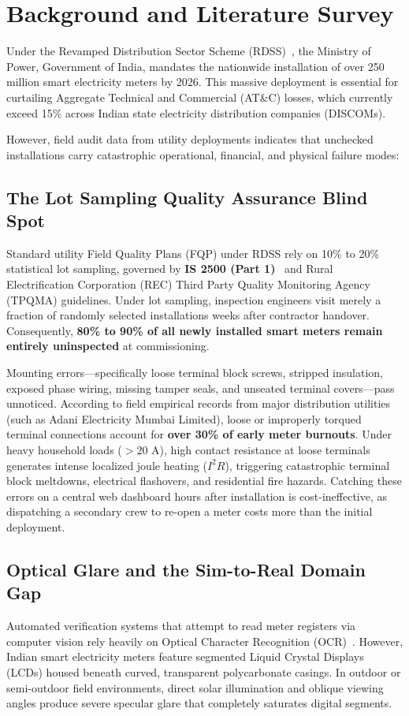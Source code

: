 \documentclass[12pt,a4paper,oneside]{report}
\begin{document}
\section{Background and Literature Survey}
Under the Revamped Distribution Sector Scheme (RDSS)~\cite{cea2021rdss}, the Ministry of Power, Government of India, mandates the nationwide installation of over 250 million smart electricity meters by 2026. This massive deployment is essential for curtailing Aggregate Technical and Commercial (AT\&C) losses, which currently exceed 15\% across Indian state electricity distribution companies (DISCOMs).

However, field audit data from utility deployments indicates that unchecked installations carry catastrophic operational, financial, and physical failure modes:

\subsection{The Lot Sampling Quality Assurance Blind Spot}
Standard utility Field Quality Plans (FQP) under RDSS rely on 10\% to 20\% statistical lot sampling, governed by \textbf{IS 2500 (Part 1)}~\cite{bis2500} and Rural Electrification Corporation (REC) Third Party Quality Monitoring Agency (TPQMA) guidelines. Under lot sampling, inspection engineers visit merely a fraction of randomly selected installations weeks after contractor handover. Consequently, \textbf{80\% to 90\% of all newly installed smart meters remain entirely uninspected} at commissioning.

Mounting errors---specifically loose terminal block screws, stripped insulation, exposed phase wiring, missing tamper seals, and unseated terminal covers---pass unnoticed. According to field empirical records from major distribution utilities (such as Adani Electricity Mumbai Limited), loose or improperly torqued terminal connections account for \textbf{over 30\% of early meter burnouts}. Under heavy household loads ($>20\text{~A}$), high contact resistance at loose terminals generates intense localized joule heating ($I^2 R$), triggering catastrophic terminal block meltdowns, electrical flashovers, and residential fire hazards. Catching these errors on a central web dashboard hours after installation is cost-ineffective, as dispatching a secondary crew to re-open a meter costs more than the initial deployment.

\subsection{Optical Glare and the Sim-to-Real Domain Gap}
Automated verification systems that attempt to read meter registers via computer vision rely heavily on Optical Character Recognition (OCR)~\cite{laroca2019convolutional, salomon2020deep}. However, Indian smart electricity meters feature segmented Liquid Crystal Displays (LCDs) housed beneath curved, transparent polycarbonate casings. In outdoor or semi-outdoor field environments, direct solar illumination and oblique viewing angles produce severe specular glare that completely saturates digital segments.
\end{document}
